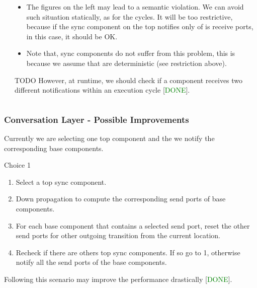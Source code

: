 \documentclass[compress,xcolor=dvipsnames,10pt]{beamer}
\begin{document}
\begin{frame}
\begin{columns}
\begin{column}{0.4\textwidth}
\end{column}
\begin{column}{0.6\textwidth}
\begin{itemize}
\item The figures on the left may lead to a semantic violation. We can avoid such situation statically, as for the cycles. It will be too restrictive, because if the sync component on the top notifies only of is receive ports, in this case, it should be OK. 
\item Note that, sync components do not suffer from this problem, this is because we assume that are deterministic (see restriction above). 
\end{itemize}

\begin{block}{TODO}
However, at runtime, we should check if a component receives two different notifications within an execution cycle [\textcolor{green}{DONE}]. 
\end{block}
\end{column}
\end{columns}
\end{frame}


\begin{frame}
\frametitle{Conversation Layer - Possible Improvements}
Currently we are selecting one top component and the we notify the corresponding base components. 
\begin{block}{Choice 1}
\begin{enumerate}
\item Select a top sync component.
\item Down propagation to compute the corresponding send ports of base components.
\item For each base component that contains a selected send port, reset the other send ports for other outgoing transition from the current location.
\item Recheck if there are others top sync components. If so go to 1, otherwise notify all the send ports of the base components.  
\end{enumerate}
\end{block}

Following this scenario may improve the performance drastically [\textcolor{green}{DONE}]. 
\end{frame}
\end{document}
